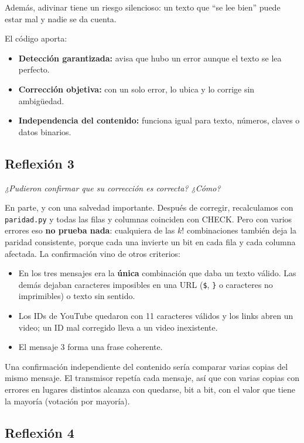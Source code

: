 \documentclass[11pt,a4paper]{article}
\begin{document}
Además, adivinar tiene un riesgo silencioso: un texto que ``se lee bien'' puede estar mal y nadie se da cuenta.

El código aporta:
\begin{itemize}
  \item \textbf{Detección garantizada:} avisa que hubo un error aunque el texto se lea perfecto.
  \item \textbf{Corrección objetiva:} con un solo error, lo ubica y lo corrige sin ambigüedad.
  \item \textbf{Independencia del contenido:} funciona igual para texto, números, claves o datos binarios.
\end{itemize}

\subsection*{Reflexión 3}

\textit{¿Pudieron confirmar que su corrección es correcta? ¿Cómo?}

\medskip

En parte, y con una salvedad importante. Después de corregir, recalculamos con \texttt{paridad.py} y todas las filas y columnas coinciden con CHECK. Pero con varios errores eso \textbf{no prueba nada}: cualquiera de las $k!$ combinaciones también deja la paridad consistente, porque cada una invierte un bit en cada fila y cada columna afectada. La confirmación vino de otros criterios:

\begin{itemize}
  \item En los tres mensajes era la \textbf{única} combinación que daba un texto válido. Las demás dejaban caracteres imposibles en una URL (\texttt{\$}, \texttt{\}} o caracteres no imprimibles) o texto sin sentido.
  \item Los IDs de YouTube quedaron con 11 caracteres válidos y los links abren un video; un ID mal corregido lleva a un video inexistente.
  \item El mensaje 3 forma una frase coherente.
\end{itemize}

Una confirmación independiente del contenido sería comparar varias copias del mismo mensaje. El transmisor repetía cada mensaje, así que con varias copias con errores en lugares distintos alcanza con quedarse, bit a bit, con el valor que tiene la mayoría (votación por mayoría).

\subsection*{Reflexión 4}
\end{document}
